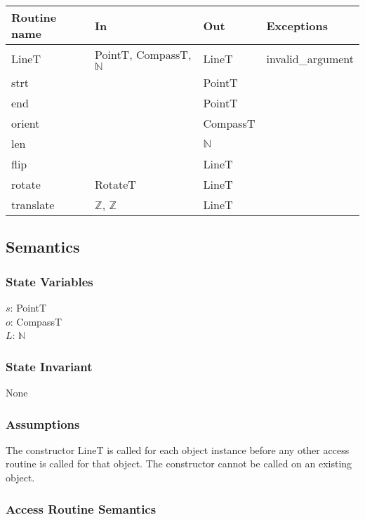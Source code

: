 \documentclass[12pt]{article}
\begin{document}
\begin{tabular}{| l | l | l | l |}
\hline
\textbf{Routine name} & \textbf{In} & \textbf{Out} & \textbf{Exceptions}\\
\hline
LineT & PointT, CompassT, $\mathbb{N}$ & LineT & invalid\_argument\\
\hline
strt & ~ & PointT & ~\\
\hline
end & ~ & PointT & ~\\
\hline
orient & ~ & CompassT & ~\\
\hline
 len & ~ & $\mathbb{N}$ & ~\\
\hline
flip & ~ & LineT & ~\\
\hline
rotate & RotateT & LineT & ~\\
\hline
translate & $\mathbb{Z}$, $\mathbb{Z}$ & LineT  & ~\\
\hline
\end{tabular}

\subsection* {Semantics}

\subsubsection* {State Variables}

$s$: PointT\\
$o$: CompassT\\
$L$: $\mathbb{N}$\\ 

\subsubsection* {State Invariant}

None

\subsubsection* {Assumptions}

The constructor LineT is called for each object instance before any other
access routine is called for that object.  The constructor cannot be called on
an existing object.

\subsubsection* {Access Routine Semantics}
\end{document}
